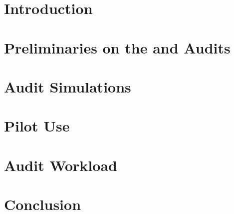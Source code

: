 \section{Introduction}
\label{sec:intro}


\section{Preliminaries on the \BRAVO and \Minerva Audits}
\label{sec:model}


%

\section{\Providence}
\label{sec:prov}


\section{\Providence Audit Simulations}
\label{sec:sims}


\section{Pilot Use}
\label{sec:pilot}


\section{Audit Workload}
\label{sec:workload}


\section{Conclusion}
\label{sec:conc}



